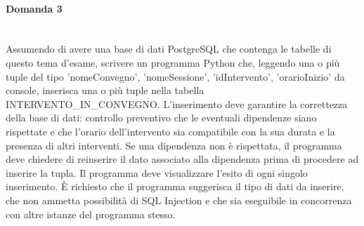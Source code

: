 \documentclass[a4paper, 10pt, titlepage]{article}
\begin{document}
\paragraph{Domanda 3}\dotfill
\\Assumendo di avere una base di dati PostgreSQL che contenga le tabelle di questo tema d'esame, scrivere un programma Python che, leggendo una o più tuple del tipo 'nomeConvegno', 'nomeSessione', 'idIntervento', 'orarioInizio' da console, inserisca una o più tuple nella tabella INTERVENTO\_IN\_CONVEGNO. L'inserimento deve garantire la correttezza della base di dati: controllo preventivo che le eventuali dipendenze siano rispettate e che l'orario dell'intervento sia compatibile con la sua durata e la presenza di altri interventi. Se una dipendenza non è rispettata, il programma deve chiedere di reinserire il dato associato alla dipendenza prima di procedere ad inserire la tupla. Il programma deve visualizzare l'esito di ogni singolo inserimento. È richiesto che il programma suggerisca il tipo di dati da inserire, che non ammetta possibilità di SQL Injection e che sia eseguibile in concorrenza con altre istanze del programma stesso.
\end{document}
